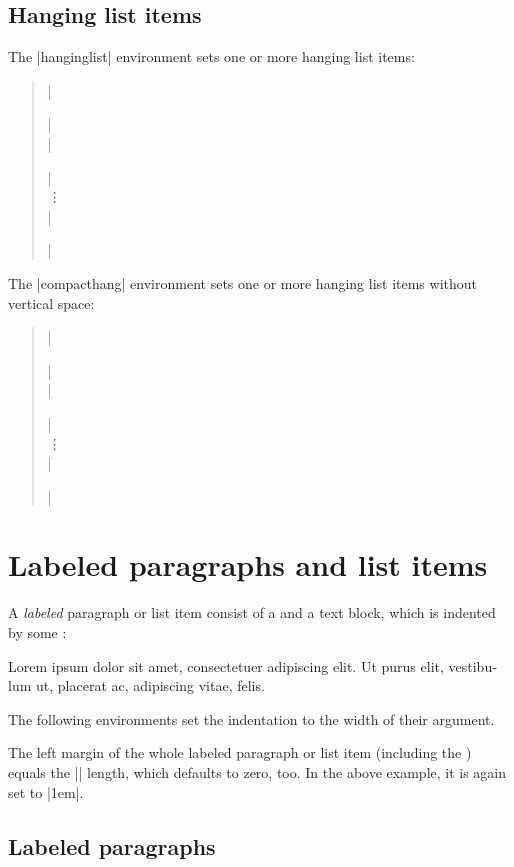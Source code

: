 \documentclass[a4paper]{ltxdoc}
\newenvironment{labeledexample}{\medskip\setlength{\labeledleftmargin}{1em}}{\medskip}
\newcommand{\lipsum}{\textlatin{Lorem ipsum dolor sit amet, consectetuer
adipiscing elit. Ut purus elit, vestibulum ut, placerat ac, adipiscing vitae, felis.}}
\begin{document}
\subsection{Hanging list items}

 The |hanginglist| environment sets one or more
hanging list items:
\begin{quote}
|\begin{hanginglist}| \\
|\item | \\
\vdots \\
|\end{hanginglist}|
\end{quote}

\pagebreak
{} The |compacthang| environment sets one or more
hanging list items without vertical space:
\begin{quote}
|\begin{compacthang}| \\
|\item | \\
\vdots \\
|\end{compacthang}|
\end{quote}

\section{Labeled paragraphs and list items}

A \emph{labeled} paragraph or list item consist of a  and a text
block, which is indented by some :

\begin{labeledexample}
\begin{labeledpar}{}{}
\lipsum
\end{labeledpar}
\end{labeledexample}

The following environments set the indentation  to the width of
their  argument.

 The left margin of the whole labeled
paragraph or list item (including the ) equals the
|| length, which defaults to zero, too. In the above example,
it is again set to |1em|.

\subsection{Labeled paragraphs}
\end{document}
